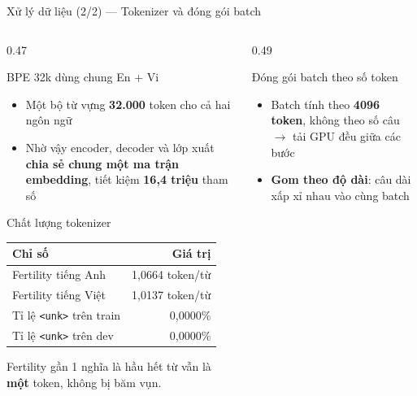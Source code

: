 \documentclass[aspectratio=169, 10pt]{beamer}
\DeclareRobustCommand{\tk}[1]{\texttt{\textless #1\textgreater}}
\newcommand{\bangchat}{\setlength{\tabcolsep}{3pt}}
\begin{document}
\begin{frame}[shrink=10]{Xử lý dữ liệu (2/2) — Tokenizer và đóng gói batch}
  \begin{columns}[T]
    \begin{column}{0.47\textwidth}
      \begin{block}{BPE 32k dùng chung En + Vi}
        \begin{itemize}
          \setlength{\itemsep}{0.15em}
          \item Một bộ từ vựng \textbf{32.000} token cho cả hai ngôn ngữ
          \item Nhờ vậy encoder, decoder và lớp xuất \textbf{chia sẻ chung một ma trận
            embedding}, tiết kiệm \textbf{16{,}4 triệu} tham số
        \end{itemize}
      \end{block}
      \begin{block}{Chất lượng tokenizer}
        \scriptsize\bangchat
        \begin{tabular}{@{}lr@{}}
          \toprule
          \textbf{Chỉ số} & \textbf{Giá trị} \\
          \midrule
          Fertility tiếng Anh          & 1{,}0664 token/từ \\
          Fertility tiếng Việt         & 1{,}0137 token/từ \\
          Tỉ lệ \tk{unk} trên train    & 0{,}0000\% \\
          Tỉ lệ \tk{unk} trên dev      & 0{,}0000\% \\
          \bottomrule
        \end{tabular}
        \par\vspace{0.3em}
        Fertility gần 1 nghĩa là hầu hết từ vẫn là \textbf{một} token, không bị băm vụn.
      \end{block}
    \end{column}
    \begin{column}{0.49\textwidth}
      \begin{block}{Đóng gói batch theo số token}
        \begin{itemize}
          \setlength{\itemsep}{0.15em}
          \item Batch tính theo \textbf{4096 token}, không theo số câu
            $\rightarrow$ tải GPU đều giữa các bước
          \item \textbf{Gom theo độ dài}: câu dài xấp xỉ nhau vào cùng batch

\end{itemize}
\end{block}
\end{column}
\end{columns}
\end{frame}
\end{document}
